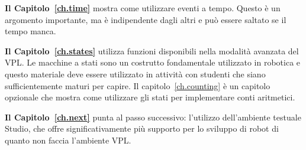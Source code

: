 \textbf{Il Capitolo~\ref{ch.time}} mostra come utilizzare eventi a tempo.
Questo è un argomento importante, ma è indipendente dagli altri
e può essere saltato se il tempo manca.

\textbf{Il Capitolo~\ref{ch.states}} utilizza funzioni disponibili nella modalità avanzata del VPL.
Le macchine a stati sono un costrutto fondamentale utilizzato in robotica e questo materiale
deve essere utilizzato in attività con studenti che siano sufficientemente maturi per capire. Il capitolo~\ref{ch.counting} è un capitolo opzionale che mostra
come utilizzare gli stati per implementare conti aritmetici.

\textbf{Il Capitolo~\ref{ch.next}} punta al passo successivo: l'utilizzo
dell'ambiente testuale Studio, che offre significativamente più supporto per
lo sviluppo di robot di quanto non faccia l'ambiente VPL.

